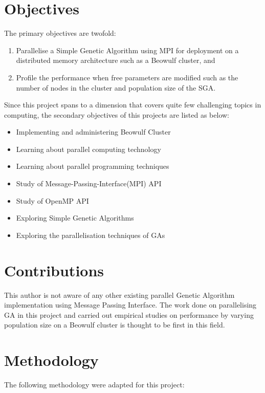\section{Objectives}
The primary objectives are twofold:
\begin{enumerate}
	\item Parallelise a Simple Genetic Algorithm using MPI for deployment on a distributed memory architecture such as a Beowulf cluster, and
	\item Profile  the performance when free parameters are modified such as the number of nodes in the cluster and population size of the SGA.
\end{enumerate}

Since this project spans to a dimension that covers quite few challenging topics in computing, the secondary objectives of this projects are listed as below:
\begin{itemize}
	\item Implementing and administering Beowulf Cluster
	\item Learning about parallel computing technology
	\item Learning about parallel programming techniques
	\item Study of Message-Passing-Interface(MPI) API
	\item Study of OpenMP API
	\item Exploring Simple Genetic Algorithms
	\item Exploring the parallelisation techniques of GAs
\end{itemize}

\section{Contributions}
This author is not aware of any other existing parallel Genetic Algorithm implementation using Message Passing Interface. The work done on parallelising GA in this project and carried out empirical studies on performance by varying population size on a Beowulf cluster is thought to be first in this field.


\section{Methodology}
The following methodology were adapted for this project:

